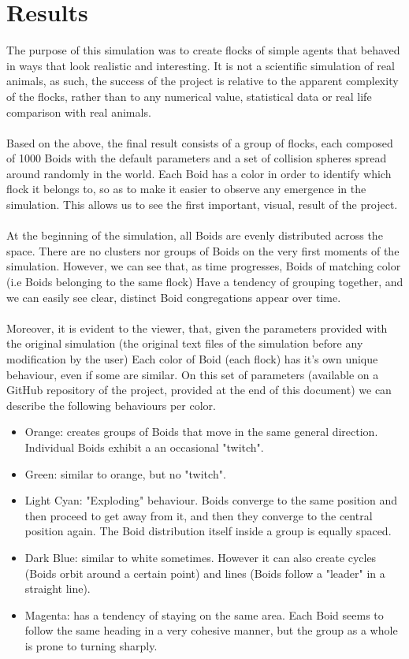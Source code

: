 \documentclass[12pt]{article}
\begin{document}
\section{Results}
The purpose of this simulation was to create flocks of simple agents that behaved in ways that look realistic and interesting. It is not a scientific simulation of real animals, as such, the success of the project is relative to the apparent complexity of the flocks, rather than to any numerical value, statistical data or real life comparison with real animals. 
\\ \\
Based on the above, the final result consists of a group of flocks, each composed of 1000 Boids with the default parameters and a set of collision spheres spread around randomly in the world.
Each Boid has a color in order to identify which flock it belongs to, so as to make it easier to observe any emergence in the simulation. This allows us to see the first important, visual, result  of the project. 
\\ \\
At the beginning of the simulation, all Boids are evenly distributed across the space. There are no clusters nor groups of Boids on the very first moments of the simulation. However, we can see that, as time progresses, Boids of matching color (i.e Boids belonging to the same flock) Have a tendency of grouping together, and we can easily see clear, distinct Boid congregations appear over time. 
\\ \\
Moreover, it is evident to the viewer, that, given the parameters provided with the original simulation (the original text files of the simulation before any modification by the user) Each color of Boid (each flock) has it's own unique behaviour, even if some are similar. On this set of parameters (available on a GitHub repository of the project, provided at the end of this document) we can describe the following behaviours per color.
\begin{itemize}
	\item Orange: creates groups of Boids that move in the same general direction. Individual Boids exhibit a an occasional "twitch".
	
	\item Green: similar to orange, but no "twitch".
	
	\item Light Cyan: "Exploding" behaviour. Boids converge to the same position and then proceed to get away from it, and then they converge to the central position again. The Boid distribution itself inside a group is equally spaced.
	
	\item Dark Blue: similar to white sometimes. However it can also create cycles (Boids orbit around a certain point) and lines (Boids follow a "leader" in a straight line).
	
	\item Magenta: has a tendency of staying on the same area. Each Boid seems to follow the same heading in a very cohesive manner, but the group as a whole is prone to turning sharply.
\end{itemize}
\end{document}
